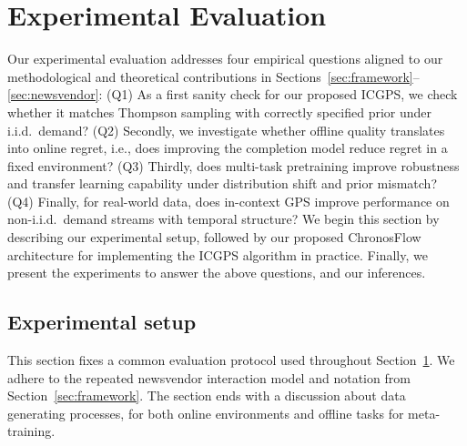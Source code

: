\documentclass[11pt]{article}
\begin{document}
\section{Experimental Evaluation}
\label{sec:experiments}
Our experimental evaluation addresses four empirical questions aligned to our methodological and theoretical contributions in Sections~\ref{sec:framework}--\ref{sec:newsvendor}: (Q1) As a first sanity check for our proposed ICGPS, we check whether it matches Thompson sampling with  correctly specified prior under i.i.d.\ demand?
(Q2) Secondly, we investigate whether offline quality translates into online regret, i.e., does improving the completion model reduce regret in a fixed environment?
(Q3) Thirdly, does multi-task pretraining improve robustness and transfer learning capability under distribution shift and prior mismatch?
(Q4) Finally, for real-world data, does in-context GPS improve performance on non-i.i.d.\ demand streams with temporal structure? We begin this section by describing our experimental setup, followed by our proposed ChronosFlow architecture for implementing the ICGPS algorithm in practice. Finally, we present the experiments to answer the above questions, and our inferences.


\subsection{Experimental setup}
This section fixes a common
evaluation protocol used throughout Section~\ref{sec:experiments}. We adhere to the repeated
newsvendor interaction model and notation from Section~\ref{sec:framework}. The section ends with a discussion about data generating processes, for both online environments and offline tasks for meta-training.
\end{document}
